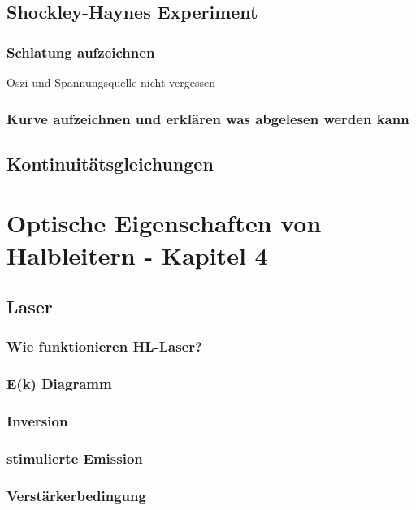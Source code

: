 \documentclass{article}
\begin{document}
\subsection{Shockley-Haynes Experiment }\label{k3:shockleyhaynes}
    \subsubsection{Schlatung aufzeichnen} Oszi und Spannungsquelle nicht vergessen
    \subsubsection{Kurve aufzeichnen und erkl\"aren was abgelesen werden kann}

\subsection{Kontinuit\"atsgleichungen }\label{k3:kontinuitaet}

\section{Optische Eigenschaften von Halbleitern - Kapitel 4}

\subsection{Laser }\label{k4:laser}
    \subsubsection{Wie funktionieren HL-Laser?}
    \subsubsection{E(k) Diagramm}
    \subsubsection{Inversion}
    \subsubsection{stimulierte Emission}
    \subsubsection{Verst\"arkerbedingung}
\end{document}
